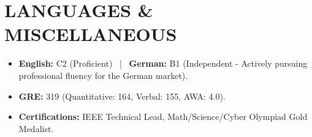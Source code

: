 \documentclass[10pt, a4paper]{article}
\begin{document}
\section{LANGUAGES \& MISCELLANEOUS}
\begin{itemize}
    \item \textbf{English:} C2 (Proficient) \ | \ \textbf{German:} B1 (Independent - Actively pursuing professional fluency for the German market).
    \item \textbf{GRE:} 319 (Quantitative: 164, Verbal: 155, AWA: 4.0).
    \item \textbf{Certifications:} IEEE Technical Lead, Math/Science/Cyber Olympiad Gold Medalist.
\end{itemize}
\end{document}
